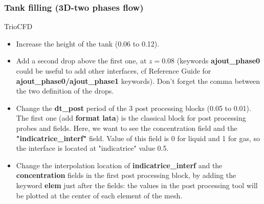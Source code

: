 \documentclass[10pt, hyperref={unicode=true,pdfusetitle, bookmarks=true,bookmarksnumbered=false,bookmarksopen=false, breaklinks=false,pdfborder={0 0 1},backref=true,colorlinks=true,linkcolor=darkblue,pageanchor}]{beamer}
\begin{document}
\begin{frame}
\frametitle{Tank filling (3D-two phases flow)}
\begin{block}{TrioCFD}

\begin{itemize}
\item Increase the height of the tank (0.06 to 0.12).

\item Add a second drop above the first one, at $z=0.08$ (keywords \textbf{ajout\_phase0} could be useful to add other interfaces, cf Reference Guide for \textbf{ajout\_phase0/ajout\_phase1} keywords). Don't forget the comma between the two definition of the drops.

\item Change the \textbf{dt\_post} period of the 3 post processing blocks (0.05 to 0.01). The first one (add \textbf{format lata}) is the classical block for post processing probes and fields. Here, we want to see the concentration field and the \textbf{"indicatrice\_interf"} field. Value of this field is 0 for liquid and 1 for gas, so the interface is located at "indicatrice" value 0.5.

\item Change the interpolation location of \textbf{indicatrice\_interf} and the \textbf{concentration} fields in the first post processing block, by adding the keyword \textbf{elem} just after the fields: the values in the post processing tool will be plotted at the center of each element of the mesh.
\end{itemize}

\end{block}
\end{frame}
\end{document}
